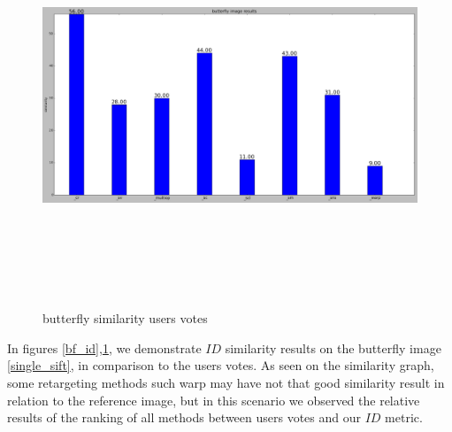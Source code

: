 		\begin{figure}[h] \label{bf_usr}
			\includegraphics[width=\linewidth,height=12cm,keepaspectratio]{Figures/bf_usr}
			\caption[butterfly similarity users votes]
			{butterfly similarity users votes}
		\end{figure}
		
In figures \ref{bf_id},\ref{bf_usr}, we demonstrate $ID$ similarity results on the butterfly image \ref{single_sift}, in comparison to the users votes. As seen on the similarity graph, some retargeting methods such warp \cite{warp} may have not that good similarity result in relation to the reference image, but in this scenario we observed the relative results of the ranking of all methods between users votes and our $ID$ metric.
		
		
		
